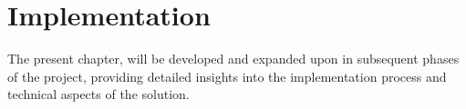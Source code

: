 %
%
\chapter{Implementation}\label{chap:implementation}

The present chapter, will be developed and expanded upon in subsequent phases of the project, providing detailed insights into the implementation process and technical aspects of the solution.